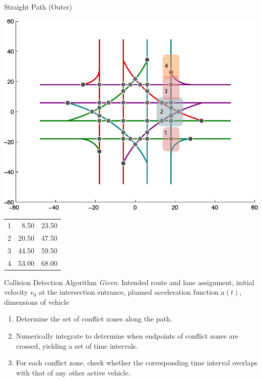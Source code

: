 \begin{frame}{Straight Path (Outer)}
\begin{minipage}{0.65\linewidth}
\centering\includegraphics[width=\linewidth]{diagram/intxn_partition_str2.pdf}
\end{minipage}
\hfill
\begin{minipage}{0.3\linewidth}
\footnotesize
	\begin{tabular}{| c | r r |}
	\hline
	1 & 8.50 & 23.50 \\
	2 & 20.50 & 47.50 \\
	3 & 44.50 & 59.50 \\
	4 & 53.00 & 68.00 \\
	\hline
	\end{tabular}
\end{minipage}
\end{frame}


\begin{frame}{Collision Detection Algorithm}
\emph{Given}: Intended route and lane assignment, initial velocity
	$v_0$ at the intersection entrance, planned acceleration function
	$a(t)$, dimensions of vehicle
\begin{enumerate}
\item Determine the set of conflict zones along the path.
\item Numerically integrate to determine when endpoints of conflict
	zones are crossed, yielding a set of time intervals.
\item For each conflict zone, check whether the corresponding time
	interval overlaps with that of any other active vehicle.
\end{enumerate}
\end{frame}

